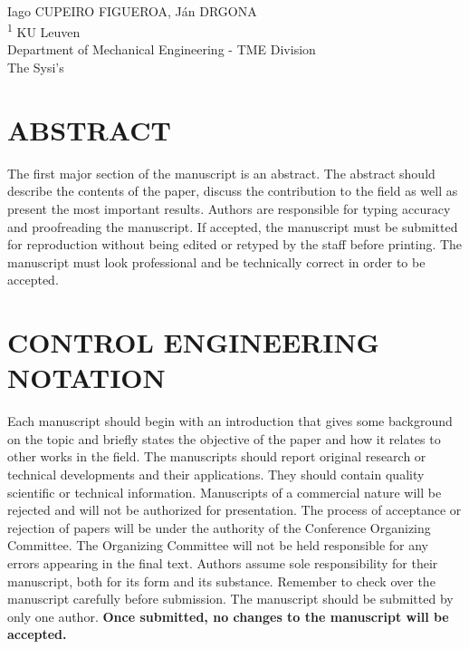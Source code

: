 \documentclass[10pt]{extarticle}
\begin{document}
	
\begin{center}
\vspace{0.2in}
\\[14pt]

{\fontsize{11pt}{1.2em}\selectfont
Iago CUPEIRO FIGUEROA, Ján DRGONA
\\[11pt]
\textsuperscript{1} KU Leuven\\
Department of Mechanical Engineering - TME Division\\
The Sysi's \\[11pt]
}
\end{center}

\vfill


\section*{ABSTRACT}

The first major section of the manuscript is an abstract.  The abstract should describe the contents of the paper, discuss the contribution to the field as well as present the most important results.  Authors are responsible for typing accuracy and proofreading the manuscript.  If accepted, the manuscript must be submitted for reproduction without being edited or retyped by the staff before printing.  The manuscript must look professional and be technically correct in order to be accepted. 

\section{CONTROL ENGINEERING NOTATION}

Each manuscript should begin with an introduction that gives some background on the topic and briefly states the objective of the paper and how it relates to other works in the field.  The manuscripts should report original research or technical developments and their applications.  They should contain quality scientific or technical information.  Manuscripts of a commercial nature will be rejected and will not be authorized for presentation.  The process of acceptance or rejection of papers will be under the authority of the Conference Organizing Committee.  The Organizing Committee will not be held responsible for any errors appearing in the final text.  Authors assume sole responsibility for their manuscript, both for its form and its substance.  Remember to check over the manuscript carefully before submission.  The manuscript should be submitted by only one author. \textbf{Once submitted, no changes to the manuscript will be accepted.} 
\end{document}
